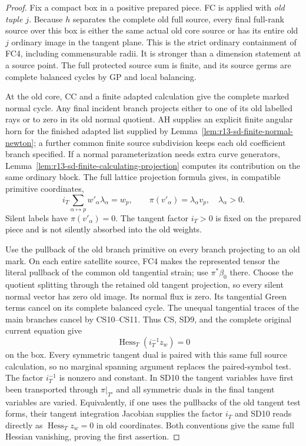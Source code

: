 \begin{proof}
Fix a compact box in a positive prepared piece.  FC is applied
with \emph{old tuple $j$}.  Because $h$ separates the complete
old full source, every final full-rank source over this box is
either the same actual old core source or has its entire old
$j$ ordinary image in the tangent plane.  This is the strict
ordinary containment of FC4, including commensurable radii.
It is stronger than a dimension statement at a source point.
The full protected source sum is finite, and its source germs
are complete balanced cycles by GP and local balancing.

At the old core, CC and a finite adapted calculation give the
complete marked normal cycle.  Any final incident branch projects
either to one of its old labelled rays or to zero in its old
normal quotient.  AH supplies an explicit finite angular horn
for the finished adapted list supplied by
Lemma~\ref{lem:r13-sd-finite-normal-newton}; a further common finite source
subdivision keeps each old coefficient branch specified.
If a normal parameterization needs extra curve generators,
Lemma~\ref{lem:r13-sd-finite-calculating-projection} computes its
contribution on the same ordinary block.  The full lattice
projection formula gives, in compatible primitive coordinates,
\[
         i_T\sum_{\alpha\mapsto p}w'_\alpha\lambda_\alpha=w_p,
       \qquad \pi(v'_\alpha)=\lambda_\alpha v_p,
                      \quad\lambda_\alpha>0.
 \tag{SD9}
\]
Silent labels have $\pi(v'_\alpha)=0$.  The tangent factor
$i_T>0$ is fixed on the prepared piece and is not silently
absorbed into the old weights.

Use the pullback of the old branch primitive on every branch
projecting to an old mark.  On each entire satellite source,
FC4 makes the represented tensor the literal pullback of the
common old tangential strain; use $\pi^*\beta_0$ there.
Choose the quotient splitting through the retained old tangent
projection, so every silent normal vector has zero old image.
Its normal flux is zero.  Its tangential Green terms cancel on
its complete balanced cycle.  The unequal tangential traces of
the main branches cancel by CS10--CS11.  Thus CS, SD9, and the
complete original current equation give
\[
                  \operatorname{Hess}_T(i_T^{-1}z_w)=0
 \tag{SD10}
\]
on the box.  Every symmetric tangent dual is paired with this
same full source calculation, so no marginal spanning argument
replaces the paired-symbol test.  The factor $i_T^{-1}$ is
nonzero and constant.  In SD10 the tangent variables have first
been transported through $\pi|_{T'}$ and all symmetric duals
in the final tangent variables are varied.  Equivalently, if
one uses the pullbacks of the old tangent test forms, their
tangent integration Jacobian supplies the factor $i_T$ and
SD10 reads directly as $\operatorname{Hess}_Tz_w=0$ in old
coordinates.  Both conventions give the same full Hessian
vanishing, proving the first assertion.


\end{proof}
